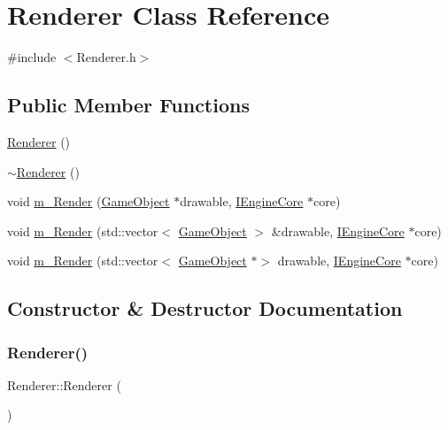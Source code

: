 \hypertarget{class_renderer}{}\section{Renderer Class Reference}
\label{class_renderer}


{\ttfamily \#include $<$Renderer.\+h$>$}

\subsection*{Public Member Functions}
\begin{DoxyCompactItemize}
\item 
\mbox{\hyperlink{class_renderer_a7ebf46f54dab9905f79b80f7fddb76a6}{Renderer}} ()
\item 
\mbox{\hyperlink{class_renderer_afeee408862d5bd6255a6882d47e6d5cd}{$\sim$\+Renderer}} ()
\item 
void \mbox{\hyperlink{class_renderer_a5413bf99fb5a945ca2be17b83cbd43e5}{m\+\_\+\+Render}} (\mbox{\hyperlink{class_game_object}{Game\+Object}} $\ast$drawable, \mbox{\hyperlink{class_i_engine_core}{I\+Engine\+Core}} $\ast$core)
\item 
void \mbox{\hyperlink{class_renderer_a6852a562bd5a7ed130c16bb1d1eaebdc}{m\+\_\+\+Render}} (std\+::vector$<$ \mbox{\hyperlink{class_game_object}{Game\+Object}} $>$ \&drawable, \mbox{\hyperlink{class_i_engine_core}{I\+Engine\+Core}} $\ast$core)
\item 
void \mbox{\hyperlink{class_renderer_a2f7d175aafc8170e9082ea39abae1628}{m\+\_\+\+Render}} (std\+::vector$<$ \mbox{\hyperlink{class_game_object}{Game\+Object}} $\ast$$>$ drawable, \mbox{\hyperlink{class_i_engine_core}{I\+Engine\+Core}} $\ast$core)
\end{DoxyCompactItemize}


\subsection{Constructor \& Destructor Documentation}
\mbox{\label{class_renderer_a7ebf46f54dab9905f79b80f7fddb76a6}} 
\subsubsection{\texorpdfstring{Renderer()}{Renderer()}}
{\footnotesize\ttfamily Renderer\+::\+Renderer (\begin{DoxyParamCaption}{ }\end{DoxyParamCaption})}

